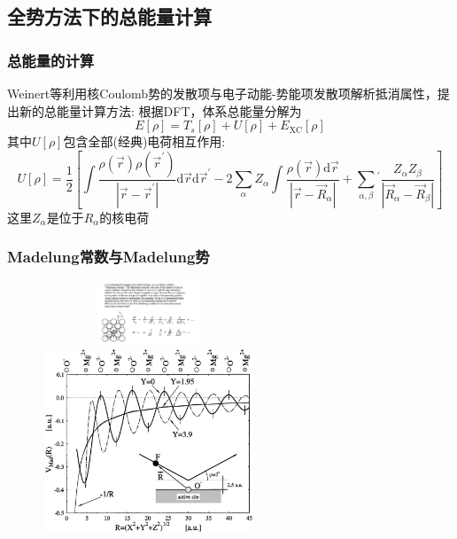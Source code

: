 \subsection{全势方法下的总能量计算}
\frame
{
	\frametitle{总能量的计算}
	\textrm{Weinert}等利用核\textrm{Coulomb}势的发散项与电子动能-势能项发散项解析抵消属性，提出新的总能量计算方法:
	根据\textrm{DFT}，体系总能量分解为
	\begin{displaymath}
		E[\rho]=T_s[\rho]+U[\rho]+E_{\mathrm{XC}}[\rho]
	\end{displaymath}
	其中$U[\rho]$包含全部(经典)电荷相互作用:~
	\begin{displaymath}
		U[\rho]=\dfrac12\left[\int\dfrac{\rho(\vec r)\rho(\vec r^{\prime})}{|\vec r-\vec r^{\prime}|}\mathrm{d}\vec r\mathrm{d}\vec r^{\prime}-2\sum_{\alpha}Z_{\alpha}\int\dfrac{\rho(\vec r)\mathrm{d}\vec r}{|\vec r-\vec R_{\alpha}|}+\sum_{\alpha,\beta}{}^{\prime}\dfrac{Z_{\alpha}Z_{\beta}}{|\vec R_{\alpha}-\vec R_{\beta}|}\right]
	\end{displaymath}
	这里$Z_{\alpha}$是位于$R_{\alpha}$的核电荷
}

\frame
{
	\frametitle{\textrm{Madelung}常数与\textrm{Madelung}势}
\begin{figure}[h!]
\vspace*{-10pt}
\centering
\includegraphics[height=0.75in,width=2.50in,viewport=0 15 950 330,clip]{Figures/Madelung_Constant.jpg}\\
\includegraphics[height=2.15in,width=2.50in,viewport=0 0 850 750,clip]{Figures/Madelung-potential-V-Mad-for-different-impact-parameters-Y-along-a-grazing-trajectory.png}
\label{Madelung-Constant_Potential}
\end{figure}
}

